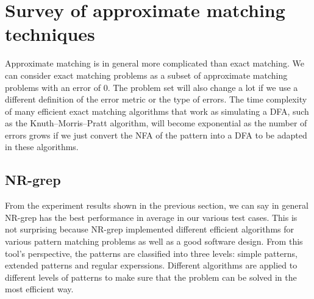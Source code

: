 \section{Survey of approximate matching techniques}
Approximate matching is in general more complicated than exact matching. We can consider exact matching problems as a subset of approximate matching problems with an error of 0. The problem set will also change a lot if we use a different definition of the error metric or the type of errors. The time complexity of many efficient exact matching algorithms that work as simulating a DFA, such as the Knuth–Morris–Pratt algorithm, will become exponential as the number of errors grows if we just convert the NFA of the pattern into a DFA to be adapted in these algorithms. 

\begin{comment}

\subsection{Dynamic programming}

One of the classical solutions to approximate matching problem is to use dynamic programming. This method is simple and easy to be implemented by programming. 



\subsection{Autamata simulation}
Another classical one is automata simulation. The algortihm BNDM  (we will explain later) over which NR-grep is built is basically a simulation of an NFA. 

\end{comment}


\subsection{NR-grep}
From the experiment results shown in the previous section, we can say in general NR-grep has the best performance in average in our various test cases. This is not surprising because NR-grep implemented different efficient algorithms for various pattern matching problems as well as a good software design. From this tool's perspective, the patterns are classified into three levels: simple patterns, extended patterns and regular experssions. Different algorithms are applied to different levels of patterns to make sure that the problem can be solved in the most efficient way. 

